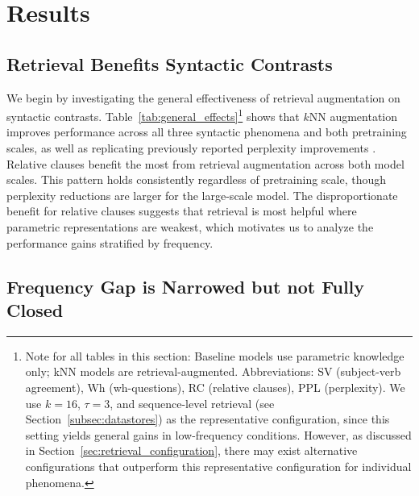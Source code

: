 \section{Results}


\subsection{Retrieval Benefits Syntactic Contrasts}
We begin by investigating the general effectiveness of retrieval augmentation on syntactic contrasts. Table~\ref{tab:general_effects}\footnote{Note for all tables in this section: Baseline models use parametric knowledge only; kNN models are retrieval-augmented. Abbreviations: SV (subject-verb agreement), Wh (wh-questions), RC (relative clauses), PPL (perplexity). We use $k=16$, $\tau=3$, and sequence-level retrieval (see Section~\ref{subsec:datastores}) as the representative configuration, since this setting yields general gains in low-frequency conditions. However, as discussed in Section~\ref{sec:retrieval_configuration}, there may exist alternative configurations that outperform this representative configuration for individual phenomena.} shows that $k$NN augmentation improves performance across all three syntactic phenomena and both pretraining scales, as well as replicating previously reported perplexity improvements \citep{khandelwal2020knnlm}. Relative clauses benefit the most from retrieval augmentation across both model scales. This pattern holds consistently regardless of pretraining scale, though perplexity reductions are larger for the large-scale model. The disproportionate benefit for relative clauses suggests that retrieval is most helpful where parametric representations are weakest, which motivates us to analyze the performance gains stratified by frequency.


\subsection{Frequency Gap is Narrowed but not Fully Closed}
\label{sec:frequency_effects}

